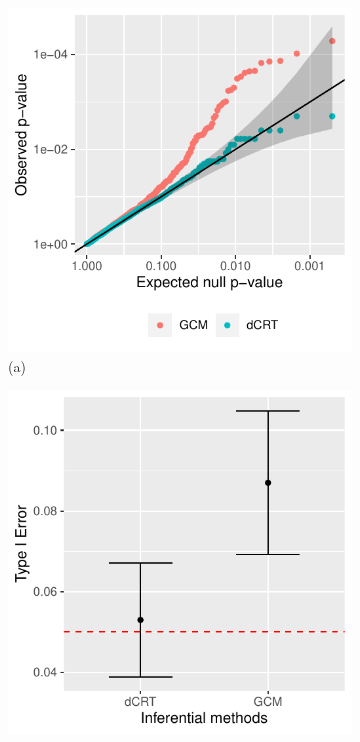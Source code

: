 \documentclass{article}
\begin{document}
\begin{figure}
    \centering
    \begin{subfigure}[h]{0.3\textwidth}
        \centering
        \includegraphics[width=\textwidth]{Figures/Q1/qq-plots.pdf} \\
        \small{(a)}
    \end{subfigure}
    \begin{subfigure}[h]{0.3\textwidth}  
        \centering
        \includegraphics[width=\textwidth]{Figures/Q1/type_I_err_5e-2.pdf} \\ 

\end{subfigure}
\end{figure}
\end{document}

